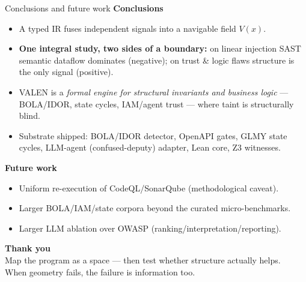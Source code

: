 \documentclass[aspectratio=169,11pt]{beamer}
\begin{document}
\begin{frame}{Conclusions and future work}
  \textbf{Conclusions}
  \begin{itemize}
    \item A typed IR fuses independent signals into a navigable field $V(x)$.
    \item \textbf{One integral study, two sides of a boundary:} on linear injection
          SAST semantic dataflow dominates (negative); on trust \& logic flaws
          structure is the only signal (positive).
    \item VALEN is a \emph{formal engine for structural invariants and business
          logic} --- BOLA/IDOR, state cycles, IAM/agent trust --- where taint is
          structurally blind.
    \item Substrate shipped: BOLA/IDOR detector, OpenAPI gates, GLMY state cycles,
          LLM-agent (confused-deputy) adapter, Lean core, Z3 witnesses.
  \end{itemize}
  \vspace{2mm}
  \textbf{Future work}
  \begin{itemize}
    \item Uniform re-execution of CodeQL/SonarQube (methodological caveat).
    \item Larger BOLA/IAM/state corpora beyond the curated micro-benchmarks.
    \item Larger LLM ablation over OWASP (ranking/interpretation/reporting).
  \end{itemize}
\end{frame}

\begin{frame}
  \centering
  \Large\color{valen}\textbf{Thank you}\\[4mm]
  \normalsize\color{black}
  Map the program as a space --- then test whether structure actually helps.\\[1mm]
  When geometry fails, the failure is information too.
\end{frame}
\end{document}
